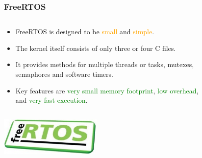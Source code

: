 \documentclass{beamer}
\begin{document}
\begin{frame}
	\frametitle{FreeRTOS}
	\begin{columns}[c]
		\begin{column}{30cm}
			\vspace{.1cm}
			\begin{itemize}
				\justifying
				\item FreeRTOS is designed to be \textcolor{orange}{small}
				and \textcolor{orange}{simple}.
				\item The kernel itself consists of only three or four C files.
				\item It provides methods for multiple threads or tasks, mutexes,\\
				semaphores and software timers.
				\item Key features are \textcolor{green}{very small memory footprint},
				\textcolor{green}{low overhead},\\
				and \textcolor{green}{very fast execution}.
			\end{itemize}
		\end{column}
	\end{columns}
	\vspace{.5cm}
	\hspace*{5.5cm} \includegraphics[width=5cm]{figs/freertos-logo.jpg}	
\end{frame}
\end{document}
